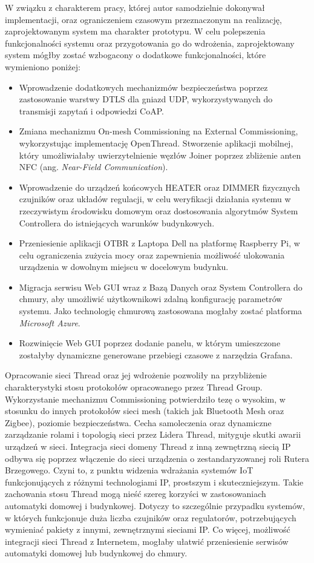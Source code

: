 W związku z charakterem pracy, której autor samodzielnie dokonywał implementacji, oraz ograniczeniem czasowym przeznaczonym na realizację, zaprojektowanym system ma charakter prototypu. W celu polepszenia funkcjonalności systemu oraz przygotowania go do wdrożenia,
zaprojektowany system mógłby zostać wzbogacony o dodatkowe funkcjonalności, które wymieniono poniżej:
\begin{itemize}
    \item Wprowadzenie dodatkowych mechanizmów bezpieczeństwa poprzez zastosowanie warstwy DTLS dla gniazd UDP, wykorzystywanych do transmisji zapytań i odpowiedzi CoAP. 
    \item Zmiana mechanizmu On-mesh Commissioning na External Commissioning, wykorzystując implementację  OpenThread. Stworzenie aplikacji mobilnej, który umożliwiałaby uwierzytelnienie węzłów Joiner poprzez zbliżenie anten NFC (ang. \textit{Near-Field Communication}).
    \item Wprowadzenie do urządzeń końcowych HEATER oraz DIMMER fizycznych czujników oraz układów regulacji, w celu weryfikacji działania systemu w rzeczywistym środowisku domowym oraz dostosowania algorytmów System Controllera do istniejących warunków budynkowych.
    \item Przeniesienie aplikacji OTBR z Laptopa Dell na platformę Raspberry Pi, w celu ograniczenia zużycia mocy oraz zapewnienia możliwość ulokowania urządzenia w dowolnym miejscu w docelowym budynku.
    \item Migracja serwisu Web GUI wraz z Bazą Danych oraz System Controllera do chmury, aby umożliwić użytkownikowi zdalną konfigurację parametrów systemu. Jako technologię chmurową zastosowana mogłaby zostać platforma \textit{Microsoft Azure}.
    \item Rozwinięcie Web GUI poprzez dodanie panelu, w którym umieszczone zostałyby dynamiczne generowane przebiegi czasowe z narzędzia Grafana.
\end{itemize}

Opracowanie sieci Thread oraz jej wdrożenie pozwoliły na przybliżenie charakterystyki stosu protokołów opracowanego przez Thread Group. Wykorzystanie mechanizmu Commissioning potwierdziło tezę o wysokim, w stosunku do innych protokołów sieci mesh (takich jak Bluetooth Mesh oraz Zigbee), poziomie bezpieczeństwa. Cecha samoleczenia oraz dynamiczne zarządzanie rolami i topologią sieci przez Lidera Thread, mityguje skutki awarii urządzeń w sieci. Integracja sieci domeny Thread z inną zewnętrzną siecią IP odbywa się poprzez włączenie do sieci urządzenia o zestandaryzowanej roli Rutera Brzegowego. Czyni to, z punktu widzenia wdrażania systemów IoT funkcjonujących z różnymi technologiami IP, prostszym i skuteczniejszym. Takie zachowania stosu Thread mogą nieść szereg korzyści w zastosowaniach automatyki domowej i budynkowej. Dotyczy to szczególnie przypadku systemów, w których funkcjonuje duża liczba czujników oraz regulatorów, potrzebujących wymieniać pakiety z innymi, zewnętrznymi sieciami IP. Co więcej, możliwość integracji sieci Thread z Internetem, mogłaby ułatwić przeniesienie serwisów automatyki domowej lub budynkowej do chmury.

